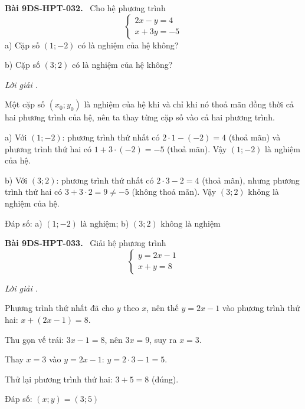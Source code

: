 \documentclass[12pt,a4paper]{article}
\newenvironment{problem}[1][]{\par\medskip\noindent\textbf{Bài #1.}\ }{\par}
\newenvironment{solution}[1][]{\par\noindent\textit{Lời giải #1.}\par}{\par}
\begin{document}
\begin{problem}[9DS-HPT-032]
Cho hệ phương trình
\[ \begin{cases} 2x - y = 4 \\ x + 3y = -5 \end{cases} \]
a) Cặp số $(1; -2)$ có là nghiệm của hệ không?

b) Cặp số $(3; 2)$ có là nghiệm của hệ không?

\begin{solution}
Một cặp số $(x_0; y_0)$ là nghiệm của hệ khi và chỉ khi nó thoả mãn đồng thời cả hai phương trình của hệ, nên ta thay từng cặp số vào cả hai phương trình.

a) Với $(1; -2)$: phương trình thứ nhất có $2 \cdot 1 - (-2) = 4$ (thoả mãn) và phương trình thứ hai có $1 + 3 \cdot (-2) = -5$ (thoả mãn). Vậy $(1; -2)$ là nghiệm của hệ.

b) Với $(3; 2)$: phương trình thứ nhất có $2 \cdot 3 - 2 = 4$ (thoả mãn), nhưng phương trình thứ hai có $3 + 3 \cdot 2 = 9 \neq -5$ (không thoả mãn). Vậy $(3; 2)$ không là nghiệm của hệ.

Đáp số: a) $\boxed{(1; -2) \text{ là nghiệm}}$; b) $\boxed{(3; 2) \text{ không là nghiệm}}$
\end{solution}
\end{problem}

\begin{problem}[9DS-HPT-033]
Giải hệ phương trình
\[ \begin{cases} y = 2x - 1 \\ x + y = 8 \end{cases} \]

\begin{solution}
Phương trình thứ nhất đã cho $y$ theo $x$, nên thế $y = 2x - 1$ vào phương trình thứ hai: $x + (2x - 1) = 8$.

Thu gọn vế trái: $3x - 1 = 8$, nên $3x = 9$, suy ra $x = 3$.

Thay $x = 3$ vào $y = 2x - 1$: $y = 2 \cdot 3 - 1 = 5$.

Thử lại phương trình thứ hai: $3 + 5 = 8$ (đúng).

Đáp số: $\boxed{(x; y) = (3; 5)}$
\end{solution}
\end{problem}
\end{document}
